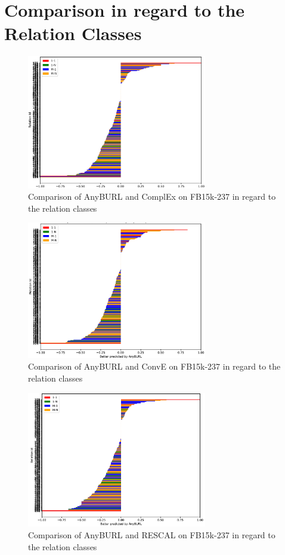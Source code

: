 \section{Comparison in regard to the Relation Classes}
\label{appendix:relation_class_fb15k}

\begin{figure}[H]
\centering
\includegraphics[width=0.7\textwidth]{images/relation_class_anyburl_complex_fb15k.PNG}
\caption{Comparison of AnyBURL and ComplEx on FB15k-237 in regard to the relation classes}
\label{fig:relation_class_anyburl_complex_fb15k}
\end{figure}

\begin{figure}[H]
\centering
\includegraphics[width=0.7\textwidth]{images/relation_class_anyburl_conve_fb15k.PNG}
\caption{Comparison of AnyBURL and ConvE on FB15k-237 in regard to the relation classes}
\label{fig:relation_class_anyburl_conve_fb15k}
\end{figure}

\begin{figure}[H]
\centering
\includegraphics[width=0.7\textwidth]{images/relation_class_anyburl_rescal_fb15k.PNG}
\caption{Comparison of AnyBURL and RESCAL on FB15k-237 in regard to the relation classes}
\label{fig:relation_class_anyburl_rescal_fb15k}
\end{figure}